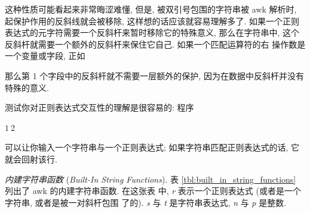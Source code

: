 这种性质可能看起来非常晦涩难懂, 但是, 被双引号包围的字符串被 awk 解析时,
起保护作用的反斜线就会被移除, 这样想的话应该就容易理解多了. 如果一个正则
表达式的元字符需要一个反斜杆来暂时移除它的特殊意义, 那么在字符串中,
这个反斜杆就需要一个额外的反斜杆来保住它自己. 如果一个匹配运算符的右
操作数是一个变量或字段, 正如
那么第 1 个字段中的反斜杆就不需要一层额外的保护, 因为在数据中反斜杆并没有
特殊的意义.

测试你对正则表达式交互性的理解是很容易的: 程序
\begin{myverb}
    $1 ~ $2
\end{myverb}
可以让你输入一个字符串与一个正则表达式; 如果字符串匹配正则表达式的话, 它
就会回射该行.

\emph{内建字符串函数} (\emph{Built-In String Functions}). 表
\ref{tbl:built_in_string_functions} 列出了 awk 的内建字符串函数. 在这张表
中, \textit{r} 表示一个正则表达式 (或者是一个字符串, 或者是被一对斜杆包围
了的). \textit{s} 与 \textit{t} 是字符串表达式, \textit{n} 与 \textit{p}
是整数.
